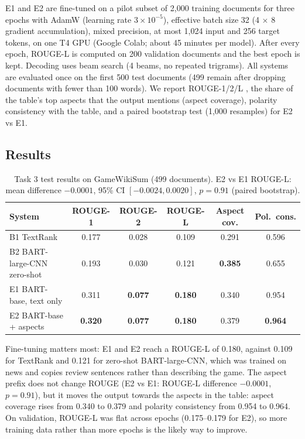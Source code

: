 \documentclass[11pt,a4paper]{article}
\begin{document}
E1 and E2 are fine-tuned on a pilot subset of 2,000 training documents for three epochs with
AdamW (learning rate $3\times10^{-5}$), effective batch size 32 (4 $\times$ 8 gradient
accumulation), mixed precision, at most 1,024 input and 256 target tokens, on one T4 GPU
(Google Colab; about 45 minutes per model). After every epoch, ROUGE-L is computed on 200
validation documents and the best epoch is kept. Decoding uses beam search (4 beams, no repeated
trigrams). All systems are evaluated once on the first 500 test documents (499 remain after
dropping documents with fewer than 100 words). We report ROUGE-1/2/L \citep{lin2004rouge}, the
share of the table's top aspects that the output mentions (aspect coverage), polarity
consistency with the table, and a paired bootstrap test (1,000 resamples) for E2 vs E1.

\subsection{Results}

\begin{table}[t]
  \centering
  \small
  \begin{tabular}{lccccc}
    \toprule
    System & ROUGE-1 & ROUGE-2 & ROUGE-L & Aspect cov. & Pol.\ cons. \\
    \midrule
    B1 TextRank & 0.177 & 0.028 & 0.109 & 0.291 & 0.596 \\
    B2 BART-large-CNN zero-shot & 0.193 & 0.030 & 0.121 & \textbf{0.385} & 0.655 \\
    E1 BART-base, text only & 0.311 & \textbf{0.077} & \textbf{0.180} & 0.340 & 0.954 \\
    E2 BART-base + aspects & \textbf{0.320} & \textbf{0.077} & \textbf{0.180} & 0.379 &
      \textbf{0.964} \\
    \bottomrule
  \end{tabular}
  \caption{Task 3 test results on GameWikiSum (499 documents). E2 vs E1 ROUGE-L: mean
  difference $-0.0001$, 95\% CI $[-0.0024, 0.0020]$, $p=0.91$ (paired bootstrap).}
  \label{tab:t3results}
\end{table}

Fine-tuning matters most: E1 and E2 reach a ROUGE-L of 0.180, against 0.109 for TextRank and
0.121 for zero-shot BART-large-CNN, which was trained on news and copies review sentences rather
than describing the game. The aspect prefix does not change ROUGE (E2 vs E1: ROUGE-L difference
$-0.0001$, $p=0.91$), but it moves the output towards the aspects in the table: aspect coverage
rises from 0.340 to 0.379 and polarity consistency from 0.954 to 0.964. On validation, ROUGE-L
was flat across epochs (0.175--0.179 for E2), so more training data rather than more epochs is
the likely way to improve.
\end{document}
